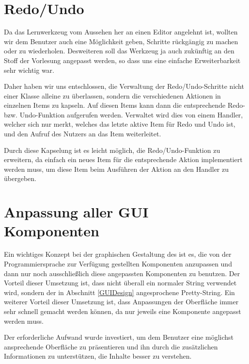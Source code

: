 \section{Redo/Undo}\label{GUIRedoUndo}

Da das Lernwerkzeug vom Aussehen her an einen Editor angelehnt ist, wollten
wir dem Benutzer auch eine Möglichkeit geben, Schritte rückgängig zu machen oder
zu wiederholen. Desweiteren soll das Werkzeug ja auch zukünftig an den Stoff der
Vorlesung angepasst werden, so dass uns eine einfache Erweiterbarkeit sehr
wichtig war.\vspace{10pt}

Daher haben wir uns entschlossen, die Verwaltung der Redo/Undo-Schritte nicht
einer Klasse alleine zu überlassen, sondern die verschiedenen Aktionen in
einzelnen Items zu kapseln. Auf diesen Items kann dann die entsprechende Redo-
bzw. Undo-Funktion aufgerufen werden. Verwaltet wird dies von einem Handler,
welcher sich nur merkt, welches das letzte aktive Item für Redo und Undo ist,
und den Aufruf des Nutzers an das Item weiterleitet.\vspace{10pt}

Durch diese Kapselung ist es leicht möglich, die Redo/Undo-Funktion zu
erweitern, da einfach ein neues Item für die entsprechende Aktion implementiert
werden muss, um diese Item beim Ausführen der Aktion an den Handler zu
übergeben.\vspace{10pt}


\section{Anpassung aller GUI Komponenten}\label{GUIAdaption}

Ein wichtiges Konzept bei der graphischen Gestaltung des \gtitool ist es, die von
der Programmiersprache zur Verfügung gestellten Komponenten anzupassen und dann
nur noch ausschließlich diese angepassten Komponenten zu benutzen. Der Vorteil
dieser Umsetzung ist, dass nicht überall ein normaler String verwendet wird,
sondern der in Abschnitt \ref{GUIDesign} angesprochene Pretty-String. Ein
weiterer Vorteil dieser Umsetzung ist, dass Anpassungen der Oberfläche immer sehr
schnell gemacht werden können, da nur jeweils eine Komponente angepasst werden
muss.\vspace{10pt}

Der erforderliche Aufwand wurde investiert, um dem Benutzer eine möglichst
ansprechende Oberfläche zu präsentieren und ihn durch die zusätzlichen
Informationen zu unterstützen, die Inhalte besser zu verstehen.\vspace{10pt}

